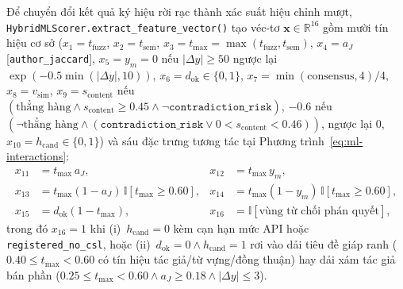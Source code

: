 Để chuyển đổi kết quả ký hiệu rời rạc thành xác suất hiệu chỉnh mượt, \texttt{HybridMLScorer.extract\_feature\_vector()} tạo véc-tơ $\mathbf{x} \in \mathbb{R}^{16}$ gồm mười tín hiệu cơ sở ($x_1 = t_{\text{fuzz}}$, $x_2 = t_{\text{sem}}$, $x_3 = t_{\max} = \max(t_{\text{fuzz}}, t_{\text{sem}})$, $x_4 = a_J$ [\texttt{author\_jaccard}], $x_5 = y_m = 0$ nếu $|\Delta y| \ge 50$ ngược lại $\exp(-0.5\min(|\Delta y|, 10))$, $x_6 = d_{\text{ok}} \in \{0, 1\}$, $x_7 = \min(\text{consensus}, 4)/4$, $x_8 = v_{\text{sim}}$, $x_9 = s_{\text{content}}$ nếu $(\text{thẳng hàng} \land s_{\text{content}} \ge 0.45 \land \neg\texttt{contradiction\_risk})$, $-0.6$ nếu $(\neg\text{thẳng hàng} \land (\texttt{contradiction\_risk} \lor 0 < s_{\text{content}} < 0.46))$, ngược lại $0$, $x_{10} = h_{\text{cand}} \in \{0, 1\}$) và sáu đặc trưng tương tác tại Phương trình~\eqref{eq:ml-interactions}:
\begin{equation}\label{eq:ml-interactions}
\begin{aligned}
x_{11} &= t_{\max}\, a_J, & x_{12} &= t_{\max}\, y_m, \\
x_{13} &= t_{\max}(1 - a_J)\,\mathbb{I}[t_{\max} \ge 0.60], & x_{14} &= t_{\max}(1 - y_m)\,\mathbb{I}[t_{\max} \ge 0.60], \\
x_{15} &= d_{\text{ok}}(1 - t_{\max}), & x_{16} &= \mathbb{I}[\text{vùng từ chối phán quyết}],
\end{aligned}
\end{equation}
trong đó $x_{16} = 1$ khi (i)~$h_{\text{cand}} = 0$ kèm cạn hạn mức API hoặc \texttt{registered\_no\_csl}, hoặc (ii)~$d_{\text{ok}} = 0 \land h_{\text{cand}} = 1$ rơi vào dải tiêu đề giáp ranh ($0.40 \le t_{\max} < 0.60$ có tín hiệu tác giả/từ vựng/đồng thuận) hay dải xám tác giả bán phần ($0.25 \le t_{\max} < 0.60 \land a_J \ge 0.18 \land |\Delta y| \le 3$).

